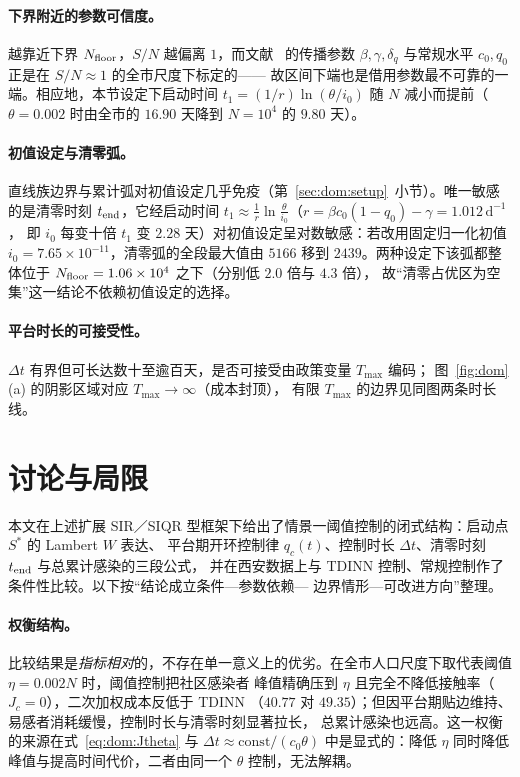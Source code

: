 \documentclass[lang=cn,a4paper,newtx]{elegantpaper}
\numberwithin{equation}{section}
\theoremstyle{plain}
\begin{document}
\paragraph{下界附近的参数可信度。}
越靠近下界 $N_{\rm floor}$，$S/N$ 越偏离 $1$，而文献~\cite{He2023TDINN} 的传播参数
$\beta,\gamma,\delta_q$ 与常规水平 $c_0,q_0$ 正是在 $S/N\approx1$ 的全市尺度下标定的——
故区间下端也是借用参数最不可靠的一端。相应地，本节设定下启动时间
$t_1=(1/r)\ln(\theta/i_0)$ 随 $N$ 减小而提前（$\theta=0.002$ 时由全市的 $16.90$ 天降到
$N=10^4$ 的 $9.80$ 天）。

\paragraph{初值设定与清零弧。}
直线族边界与累计弧对初值设定几乎免疫（第~\ref{sec:dom:setup}~小节）。唯一敏感的是清零时刻
$t_{\rm end}$，它经启动时间
$t_1\approx\frac{1}{r}\ln\frac{\theta}{i_0}$（$r=\beta c_0(1-q_0)-\gamma=1.012\,\mathrm{d}^{-1}$，
即 $i_0$ 每变十倍 $t_1$ 变 $2.28$ 天）对初值设定呈对数敏感：若改用固定归一化初值
$i_0=7.65\times10^{-11}$，清零弧的全段最大值由 $5166$ 移到 $2439$。两种设定下该弧都整体位于
$N_{\rm floor}=1.06\times10^{4}$ 之下（分别低 $2.0$ 倍与 $4.3$ 倍），
故“清零占优区为空集”这一结论不依赖初值设定的选择。

\paragraph{平台时长的可接受性。}
$\Delta t$ 有界但可长达数十至逾百天，是否可接受由政策变量 $T_{\max}$ 编码；
图~\ref{fig:dom}(a) 的阴影区域对应 $T_{\max}\to\infty$（成本封顶），
有限 $T_{\max}$ 的边界见同图两条时长线。



\section{讨论与局限}
\label{sec:discussion}

本文在上述扩展 SIR／SIQR 型框架下给出了情景一阈值控制的闭式结构：启动点 $S^\ast$ 的 Lambert $W$ 表达、
平台期开环控制律 $q_c(t)$、控制时长 $\Delta t$、清零时刻 $t_{\rm end}$ 与总累计感染的三段公式，
并在西安数据上与 TDINN 控制、常规控制作了条件性比较。以下按“结论成立条件—参数依赖—
边界情形—可改进方向”整理。

\paragraph{权衡结构。}
比较结果是\emph{指标相对}的，不存在单一意义上的优劣。在全市人口尺度下取代表阈值
$\eta=0.002N$ 时，阈值控制把社区感染者
峰值精确压到 $\eta$ 且完全不降低接触率（$J_c=0$），二次加权成本反低于 TDINN
（$40.77$ 对 $49.35$）；但因平台期贴边维持、易感者消耗缓慢，控制时长与清零时刻显著拉长，
总累计感染也远高。这一权衡的来源在式~\eqref{eq:dom:Jtheta} 与 $\Delta t\approx\text{const}/(c_0\theta)$
中是显式的：降低 $\eta$ 同时降低峰值与提高时间代价，二者由同一个 $\theta$ 控制，无法解耦。
\end{document}
